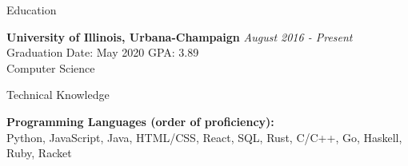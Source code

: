 \documentclass{tightResume}
\begin{document}

    \begin{rSection}{Education}

{\bf University of Illinois, Urbana-Champaign} \hfill {\em August 2016 - Present} 
\\ Graduation Date: May 2020 \hfill { GPA: 3.89}
\\ Computer Science


        \end{rSection}

        \begin{rSection}{Technical Knowledge}

            \textbf{Programming Languages (order of proficiency):}\\  Python, JavaScript, Java, HTML/CSS, React, SQL, Rust, C/C++, Go, Haskell, Ruby, Racket

            \end{rSection}

\end{document}
